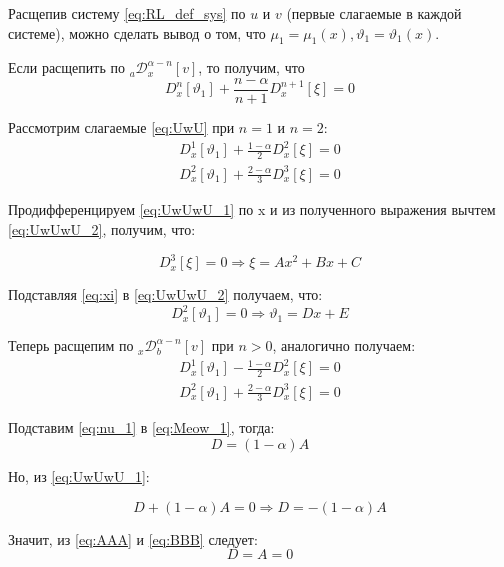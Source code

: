 \documentclass[a4paper, fontsize=14pt]{article}
\newcommand{\D}[3]{D_{#1}^{#2} \left[ #3 \right]} %
\newcommand{\RLDa}[4]{{}_{#1}\mathcal{D}_{#2}^{#4} \left[#3\right]} %
\begin{document}
Расщепив систему \eqref{eq:RL_def_sys} по $u$ и $v$ (первые слагаемые в каждой системе), можно сделать вывод о том, что $\mu_1 = \mu_1(x), \vartheta _1 = \vartheta _1(x)$.

Если расщепить по $\RLDa{a}{x}{v}{\alpha - n}$, то получим, что
\begin{equation}
  \label{eq:UwU}
  \D{x}{n}{\vartheta _1} + \frac{n - \alpha}{n + 1} \D{x}{n+1}{\xi}  = 0
\end{equation}

Рассмотрим слагаемые \eqref{eq:UwU} при $n = 1$ и $n = 2$:
\begin{gather}
  \label{eq:UwUwU_1}\D{x}{1}{\vartheta _1} + \frac{1 - \alpha}{2} \D{x}{2}{\xi} = 0 \\
  \label{eq:UwUwU_2}\D{x}{2}{\vartheta _1} + \frac{2 - \alpha}{3} \D{x}{3}{\xi} = 0
\end{gather}

Продифференцируем \eqref{eq:UwUwU_1} по x и из полученного выражения вычтем \eqref{eq:UwUwU_2}, получим, что:

\begin{equation}
  \label{eq:xi}
  \D{x}{3}{\xi} = 0 \Rightarrow \xi = A x^2 + B x + C
\end{equation}

Подставляя \eqref{eq:xi} в \eqref{eq:UwUwU_2} получаем, что:
\begin{equation}
  \label{eq:nu_1}
  \D{x}{2}{\vartheta _1} = 0 \Rightarrow \vartheta _1 = D x + E
\end{equation}

Теперь расщепим по $\RLDa{x}{b}{v}{\alpha - n}$ при $n > 0$, аналогично получаем:
\begin{gather}
  \label{eq:Meow_1}\D{x}{1}{\vartheta _1} - \frac{1 - \alpha}{2} \D{x}{2}{\xi} = 0 \\
  \label{eq:Meow_2}\D{x}{2}{\vartheta _1} + \frac{2 - \alpha}{3} \D{x}{3}{\xi} = 0
\end{gather}

Подставим \eqref{eq:nu_1} в \eqref{eq:Meow_1}, тогда:
\begin{equation}
  \label{eq:AAA}
  D = (1 - \alpha) A
\end{equation}

Но, из \eqref{eq:UwUwU_1}:

\begin{equation}
  \label{eq:BBB}
  D + (1 - \alpha) A = 0 \Rightarrow D = - (1 - \alpha) A
\end{equation}

Значит, из \eqref{eq:AAA} и \eqref{eq:BBB} следует:
\begin{equation*}
  D = A = 0
\end{equation*}
\end{document}
